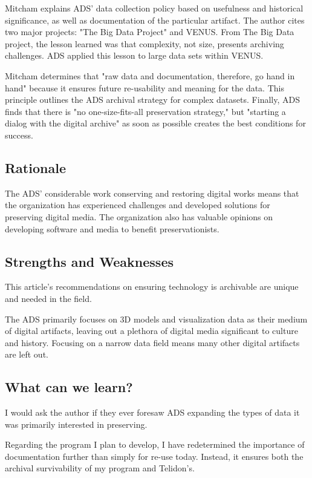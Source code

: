 \documentclass[sigconf]{acmart}
\begin{document}
Mitcham explains ADS' data collection policy based on usefulness and historical significance, as well as documentation of the particular artifact. The author cites two major projects: "The Big Data Project" and VENUS. From The Big Data project, the lesson learned was that complexity, not size, presents archiving challenges. ADS applied this lesson to large data sets within VENUS.

Mitcham determines that "raw data and documentation, therefore, go hand in hand" because it ensures future re-usability and meaning for the data. This principle outlines the ADS archival strategy for complex datasets. Finally, ADS finds that there is "no one-size-fits-all preservation strategy," but "starting a dialog with the digital archive" as soon as possible creates the best conditions for success. 

\subsection{Rationale}

The ADS' considerable work conserving and restoring digital works means that the organization has experienced challenges and developed solutions for preserving digital media. The organization also has valuable opinions on developing software and media to benefit preservationists. 

\subsection{Strengths and Weaknesses}

This article's recommendations on ensuring technology is archivable are unique and needed in the field.

The ADS primarily focuses on 3D models and visualization data as their medium of digital artifacts, leaving out a plethora of digital media significant to culture and history. Focusing on a narrow data field means many other digital artifacts are left out.

\subsection{What can we learn?}

I would ask the author if they ever foresaw ADS expanding the types of data it was primarily interested in preserving.

Regarding the program I plan to develop, I have redetermined the importance of documentation further than simply for re-use today. Instead, it ensures both the archival survivability of my program and Telidon's.
\end{document}

